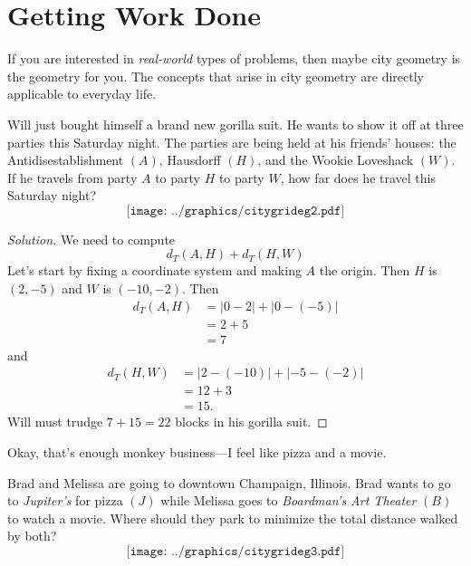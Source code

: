 \newpage


\section{Getting Work Done}

If you are interested in \textit{real-world} types of problems, then
maybe city geometry is the geometry for you. The concepts that arise
in city geometry are directly applicable to everyday life.

\begin{question}
Will just bought himself a brand new gorilla suit.
He wants to show it off at three parties this Saturday night. The
parties are being held at his friends' houses: the
Antidisestablishment $(A)$, Hausdorff $(H)$, and the Wookie Loveshack
$(W)$. If he travels from party $A$ to party $H$ to party $W$, how far
does he travel this Saturday night?
\[
\texttt{[image: ../graphics/citygrideg2.pdf]}
\]
\end{question} 
\begin{proof}[Solution] We need to compute
\[
d_T(A,H)+d_T(H,W)
\]
Let's start by fixing a coordinate system and making $A$ the
origin. Then $H$ is $(2,-5)$ and $W$ is $(-10,-2)$. Then
\begin{align*}
d_T(A,H) &=|0 - 2| + | 0 -(-5)|\\
&= 2+5\\
&=7
\end{align*}
 and 
\begin{align*}
d_T(H,W) &= | 2 - (-10) | + | -5 - (-2)|\\
&= 12 + 3 \\
&= 15.
\end{align*} 
Will must trudge $7+15 = 22$ blocks in his gorilla suit.
\end{proof}



Okay, that's enough monkey business---I feel like pizza and a movie.


\begin{question}
Brad and Melissa are going to downtown Champaign, Illinois. Brad wants
to go to \textit{Jupiter's} for pizza $(J)$ while Melissa goes to
\textit{Boardman's Art Theater} $(B)$ to watch a movie. Where should
they park to minimize the total distance walked by both?
\[
\texttt{[image: ../graphics/citygrideg3.pdf]}
\]
\end{question}

